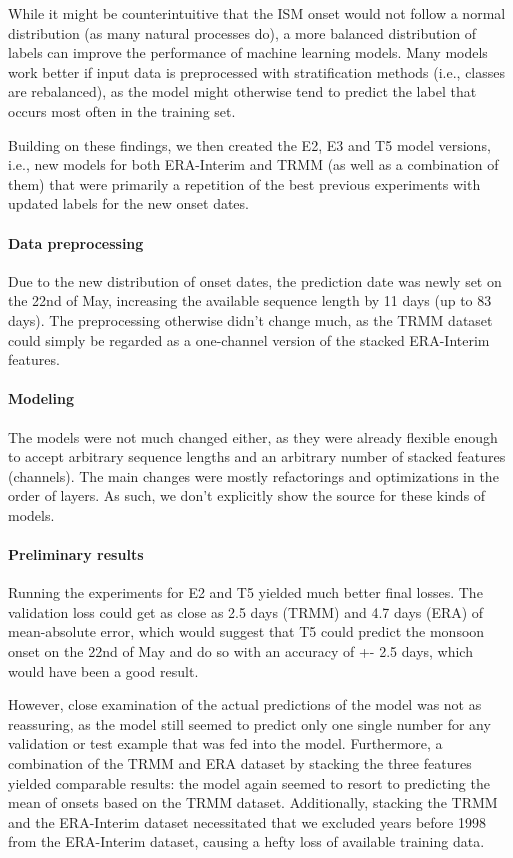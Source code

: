 While it might be counterintuitive that the ISM onset would not follow a normal distribution (as many natural processes do), a more balanced distribution of labels can improve the performance of machine learning models. Many models work better if input data is preprocessed with stratification methods (i.e., classes are rebalanced), as the model might otherwise tend to predict the label that occurs most often in the training set.

Building on these findings, we then created the E2, E3 and T5 model versions, i.e., new models for both ERA-Interim and TRMM (as well as a combination of them) that were primarily a repetition of the best previous experiments with updated labels for the new onset dates.

\paragraph{Data preprocessing}
\label{ssst:nn_e2t5_data}
Due to the new distribution of onset dates, the prediction date was newly set on the 22nd of May, increasing the available sequence length by 11 days (up to 83 days). The preprocessing otherwise didn't change much, as the TRMM dataset could simply be regarded as a one-channel version of the stacked ERA-Interim features.

\paragraph{Modeling}
\label{ssst:nn_e2t5_modeling}
The models were not much changed either, as they were already flexible enough to accept arbitrary sequence lengths and an arbitrary number of stacked features (channels). The main changes were mostly refactorings and optimizations in the order of layers. As such, we don't explicitly show the source for these kinds of models.

\paragraph{Preliminary results}
\label{ssst:nn_e2t5_results}
Running the experiments for E2 and T5 yielded much better final losses. The validation loss could get as close as 2.5 days (TRMM) and 4.7 days (ERA) of mean-absolute error, which would suggest that T5 could predict the monsoon onset on the 22nd of May and do so with an accuracy of +- 2.5 days, which would have been a good result.

However, close examination of the actual predictions of the model was not as reassuring, as the model still seemed to predict only one single number for any validation or test example that was fed into the model. Furthermore, a combination of the TRMM and ERA dataset by stacking the three features yielded comparable results: the model again seemed to resort to predicting the mean of onsets based on the TRMM dataset. Additionally, stacking the TRMM and the ERA-Interim dataset necessitated that we excluded years before 1998 from the ERA-Interim dataset, causing a hefty loss of available training data.

